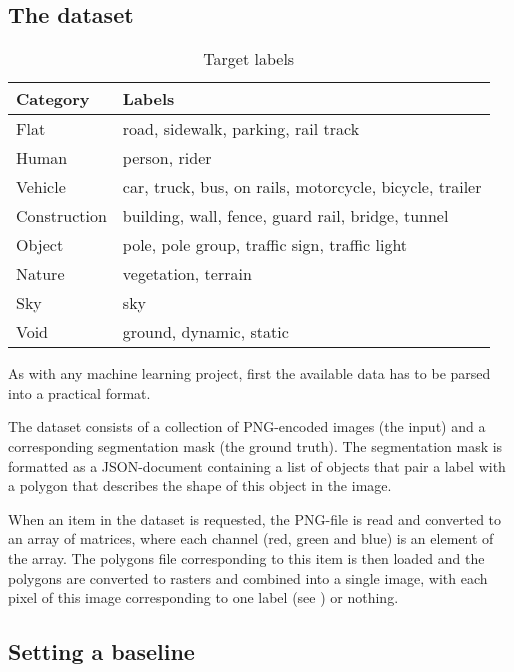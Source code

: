 \subsection{The dataset}
\label{dataset}

\begin{table}
    \centering
    \caption{Target labels}
    \label{tab:labels}
    \begin{tabular}{ll}
        \hline
        Category    & Labels \\
        \hline
        Flat        & road, sidewalk, parking, rail track \\
        Human       & person, rider \\
        Vehicle     & car, truck, bus, on rails, motorcycle, bicycle, trailer \\
        Construction& building, wall, fence, guard rail, bridge, tunnel \\
        Object      & pole, pole group, traffic sign, traffic light \\
        Nature      & vegetation, terrain \\
        Sky	        & sky \\
        Void        & ground, dynamic, static \\
        \hline
    \end{tabular}
\end{table}

As with any machine learning project, first the available data has to be parsed into a practical format.

The dataset consists of a collection of PNG-encoded images (the input) and a corresponding segmentation mask (the ground truth). The segmentation mask is formatted as a JSON-document containing a list of objects that pair a label with a polygon that describes the shape of this object in the image.

When an item in the dataset is requested, the PNG-file is read and converted to an array of matrices, where each channel (red, green and blue) is an element of the array. 
The polygons file corresponding to this item is then loaded and the polygons are converted to rasters and combined into a single image, with each pixel of this image corresponding to one label (see ) or nothing.

\subsection{Setting a baseline}
\label{subsec:baseline}

